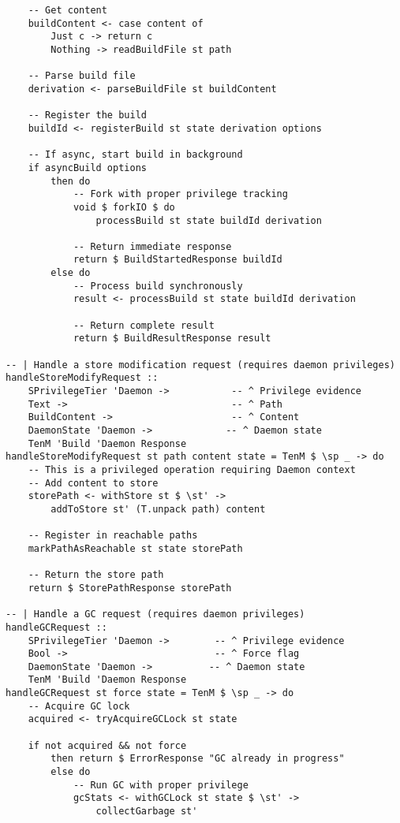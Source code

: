 \documentclass{article}
\begin{document}
\begin{tcolorbox}[title=Ten/Daemon/Server.hs Changes]
\begin{verbatim}
    -- Get content
    buildContent <- case content of
        Just c -> return c
        Nothing -> readBuildFile st path

    -- Parse build file
    derivation <- parseBuildFile st buildContent

    -- Register the build
    buildId <- registerBuild st state derivation options

    -- If async, start build in background
    if asyncBuild options
        then do
            -- Fork with proper privilege tracking
            void $ forkIO $ do
                processBuild st state buildId derivation

            -- Return immediate response
            return $ BuildStartedResponse buildId
        else do
            -- Process build synchronously
            result <- processBuild st state buildId derivation

            -- Return complete result
            return $ BuildResultResponse result

-- | Handle a store modification request (requires daemon privileges)
handleStoreModifyRequest ::
    SPrivilegeTier 'Daemon ->           -- ^ Privilege evidence
    Text ->                             -- ^ Path
    BuildContent ->                     -- ^ Content
    DaemonState 'Daemon ->             -- ^ Daemon state
    TenM 'Build 'Daemon Response
handleStoreModifyRequest st path content state = TenM $ \sp _ -> do
    -- This is a privileged operation requiring Daemon context
    -- Add content to store
    storePath <- withStore st $ \st' ->
        addToStore st' (T.unpack path) content

    -- Register in reachable paths
    markPathAsReachable st state storePath

    -- Return the store path
    return $ StorePathResponse storePath

-- | Handle a GC request (requires daemon privileges)
handleGCRequest ::
    SPrivilegeTier 'Daemon ->        -- ^ Privilege evidence
    Bool ->                          -- ^ Force flag
    DaemonState 'Daemon ->          -- ^ Daemon state
    TenM 'Build 'Daemon Response
handleGCRequest st force state = TenM $ \sp _ -> do
    -- Acquire GC lock
    acquired <- tryAcquireGCLock st state

    if not acquired && not force
        then return $ ErrorResponse "GC already in progress"
        else do
            -- Run GC with proper privilege
            gcStats <- withGCLock st state $ \st' ->
                collectGarbage st'


\end{verbatim}
\end{tcolorbox}
\end{document}
